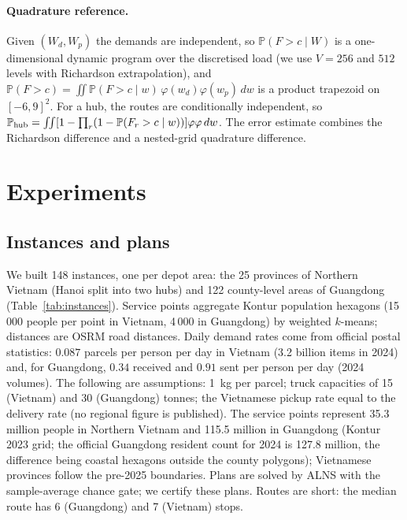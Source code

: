 \documentclass[11pt]{article}
\theoremstyle{definition}
\theoremstyle{remark}
\renewcommand{\P}{\mathbb{P}}
\begin{document}
\paragraph{Quadrature reference.} Given $(W_d,W_p)$ the demands are
independent, so $\P(F>c\mid W)$ is a one-dimensional dynamic program over the
discretised load (we use $V=256$ and $512$ levels with Richardson
extrapolation), and
$\P(F>c)=\iint\P(F>c\mid w)\,\varphi(w_d)\varphi(w_p)\,dw$ is a product
trapezoid on $[-6,9]^2$. For a hub, the routes are conditionally independent,
so $\P_{\rm hub}=\iint[1-\prod_r(1-\P(F_r>c\mid w))]\varphi\varphi\,dw$. The
error estimate combines the Richardson difference and a nested-grid
quadrature difference.

\section{Experiments}
\label{sec:experiments}

\subsection{Instances and plans}
We built 148 instances, one per depot area: the 25 provinces of Northern
Vietnam (Hanoi split into two hubs) and 122 county-level areas of Guangdong
(Table~\ref{tab:instances}). Service points aggregate Kontur population
hexagons (15\,000 people per point in Vietnam, 4\,000 in Guangdong) by
weighted $k$-means; distances are OSRM road distances. Daily demand rates
come from official postal statistics: $0.087$ parcels per person per day in
Vietnam (3.2 billion items in 2024) and, for Guangdong, $0.34$ received and
$0.91$ sent per person per day (2024 volumes). The following are assumptions:
1~kg per parcel; truck capacities of 15 (Vietnam) and 30 (Guangdong) tonnes;
the Vietnamese pickup rate equal to the delivery rate (no regional figure is
published). The service points represent 35.3 million people in Northern
Vietnam and 115.5 million in Guangdong (Kontur 2023 grid; the official
Guangdong resident count for 2024 is 127.8 million, the difference being
coastal hexagons outside the county polygons); Vietnamese provinces follow the
pre-2025 boundaries. Plans are solved by ALNS with the sample-average chance
gate; we certify these plans. Routes are short: the median route has 6
(Guangdong) and 7 (Vietnam) stops.

\begin{table}[t]
\centering\small
\caption{Instances and plans (sample-average gate). Utilisation is the
larger of mean total delivery and mean total pickup over $Q$, per route.}
\label{tab:instances}
\end{table}
\end{document}
